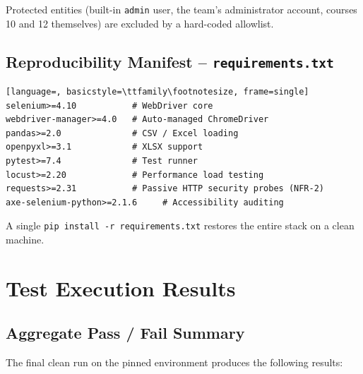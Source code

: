 \documentclass[twoside,final]{hcmut-report}
\begin{document}
Protected entities (built-in \texttt{admin} user, the team's administrator account, courses 10 and 12 themselves) are excluded by a hard-coded allowlist.

\subsection{Reproducibility Manifest -- \texttt{requirements.txt}}
\begin{lstlisting}[language=, basicstyle=\ttfamily\footnotesize, frame=single]
selenium>=4.10           # WebDriver core
webdriver-manager>=4.0   # Auto-managed ChromeDriver
pandas>=2.0              # CSV / Excel loading
openpyxl>=3.1            # XLSX support
pytest>=7.4              # Test runner
locust>=2.20             # Performance load testing
requests>=2.31           # Passive HTTP security probes (NFR-2)
axe-selenium-python>=2.1.6     # Accessibility auditing
\end{lstlisting}
A single \texttt{pip install -r requirements.txt} restores the entire stack on a clean machine.

\section{Test Execution Results}

\subsection{Aggregate Pass / Fail Summary}
The final clean run on the pinned environment produces the following results:
\end{document}

